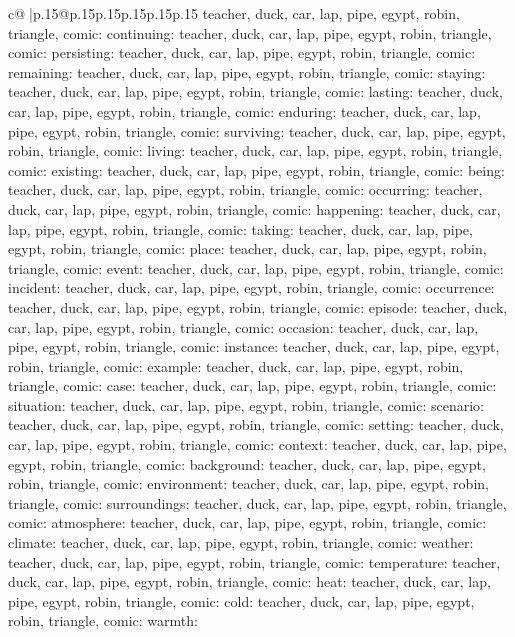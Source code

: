 \documentclass{article}
\begin{document}
{\begin{supertabular}{c@{$\;$}|p{.15\linewidth}@{}p{.15\linewidth}p{.15\linewidth}p{.15\linewidth}p{.15\linewidth}p{.15\linewidth}}
{{{teacher, duck, car, lap, pipe, egypt, robin, triangle, comic\n\nCLUE: continuing\nTARGETS: teacher, duck, car, lap, pipe, egypt, robin, triangle, comic\n\nCLUE: persisting\nTARGETS: teacher, duck, car, lap, pipe, egypt, robin, triangle, comic\n\nCLUE: remaining\nTARGETS: teacher, duck, car, lap, pipe, egypt, robin, triangle, comic\n\nCLUE: staying\nTARGETS: teacher, duck, car, lap, pipe, egypt, robin, triangle, comic\n\nCLUE: lasting\nTARGETS: teacher, duck, car, lap, pipe, egypt, robin, triangle, comic\n\nCLUE: enduring\nTARGETS: teacher, duck, car, lap, pipe, egypt, robin, triangle, comic\n\nCLUE: surviving\nTARGETS: teacher, duck, car, lap, pipe, egypt, robin, triangle, comic\n\nCLUE: living\nTARGETS: teacher, duck, car, lap, pipe, egypt, robin, triangle, comic\n\nCLUE: existing\nTARGETS: teacher, duck, car, lap, pipe, egypt, robin, triangle, comic\n\nCLUE: being\nTARGETS: teacher, duck, car, lap, pipe, egypt, robin, triangle, comic\n\nCLUE: occurring\nTARGETS: teacher, duck, car, lap, pipe, egypt, robin, triangle, comic\n\nCLUE: happening\nTARGETS: teacher, duck, car, lap, pipe, egypt, robin, triangle, comic\n\nCLUE: taking\nTARGETS: teacher, duck, car, lap, pipe, egypt, robin, triangle, comic\n\nCLUE: place\nTARGETS: teacher, duck, car, lap, pipe, egypt, robin, triangle, comic\n\nCLUE: event\nTARGETS: teacher, duck, car, lap, pipe, egypt, robin, triangle, comic\n\nCLUE: incident\nTARGETS: teacher, duck, car, lap, pipe, egypt, robin, triangle, comic\n\nCLUE: occurrence\nTARGETS: teacher, duck, car, lap, pipe, egypt, robin, triangle, comic\n\nCLUE: episode\nTARGETS: teacher, duck, car, lap, pipe, egypt, robin, triangle, comic\n\nCLUE: occasion\nTARGETS: teacher, duck, car, lap, pipe, egypt, robin, triangle, comic\n\nCLUE: instance\nTARGETS: teacher, duck, car, lap, pipe, egypt, robin, triangle, comic\n\nCLUE: example\nTARGETS: teacher, duck, car, lap, pipe, egypt, robin, triangle, comic\n\nCLUE: case\nTARGETS: teacher, duck, car, lap, pipe, egypt, robin, triangle, comic\n\nCLUE: situation\nTARGETS: teacher, duck, car, lap, pipe, egypt, robin, triangle, comic\n\nCLUE: scenario\nTARGETS: teacher, duck, car, lap, pipe, egypt, robin, triangle, comic\n\nCLUE: setting\nTARGETS: teacher, duck, car, lap, pipe, egypt, robin, triangle, comic\n\nCLUE: context\nTARGETS: teacher, duck, car, lap, pipe, egypt, robin, triangle, comic\n\nCLUE: background\nTARGETS: teacher, duck, car, lap, pipe, egypt, robin, triangle, comic\n\nCLUE: environment\nTARGETS: teacher, duck, car, lap, pipe, egypt, robin, triangle, comic\n\nCLUE: surroundings\nTARGETS: teacher, duck, car, lap, pipe, egypt, robin, triangle, comic\n\nCLUE: atmosphere\nTARGETS: teacher, duck, car, lap, pipe, egypt, robin, triangle, comic\n\nCLUE: climate\nTARGETS: teacher, duck, car, lap, pipe, egypt, robin, triangle, comic\n\nCLUE: weather\nTARGETS: teacher, duck, car, lap, pipe, egypt, robin, triangle, comic\n\nCLUE: temperature\nTARGETS: teacher, duck, car, lap, pipe, egypt, robin, triangle, comic\n\nCLUE: heat\nTARGETS: teacher, duck, car, lap, pipe, egypt, robin, triangle, comic\n\nCLUE: cold\nTARGETS: teacher, duck, car, lap, pipe, egypt, robin, triangle, comic\n\nCLUE: warmth\nTARGETS: }}}
\end{supertabular}}
\end{document}

